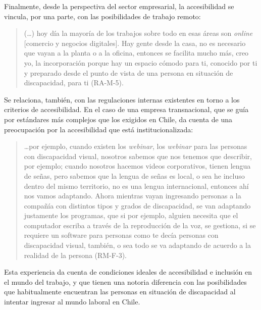 Finalmente, desde la perspectiva del sector empresarial, la
accesibilidad se vincula, por una parte, con las posibilidades de
trabajo remoto:

\begin{quote}
	(\ldots) hoy día la mayoría de los trabajos sobre todo en esas áreas son
	\emph{online} {[}comercio y negocios digitales{]}. Hay gente desde la
	casa, no es necesario que vayan a la planta o a la oficina, entonces se
	facilita mucho más, creo yo, la incorporación porque hay un espacio
	cómodo para ti, conocido por ti y preparado desde el punto de vista de
	una persona en situación de discapacidad, para ti (RA-M-5).
\end{quote}

Se relaciona, también, con las regulaciones internas existentes en torno
a los criterios de accesibilidad. En el caso de una empresa
transnacional, que se guía por estándares más complejos que los exigidos
en Chile, da cuenta de una preocupación por la accesibilidad que está
institucionalizada:

\begin{quote}
	\ldots por ejemplo, cuando existen los \emph{webinar}, los \emph{webinar}
	para las personas con discapacidad visual, nosotros sabemos que nos
	tenemos que describir, por ejemplo; cuando nosotros hacemos videos
	corporativos, tienen lengua de señas, pero sabemos que la lengua de
	señas es local, o sea he incluso dentro del mismo territorio, no es una
	lengua internacional, entonces ahí nos vamos adaptando. Ahora mientras
	vayan ingresando personas a la compañía con distintos tipos y grados de
	discapacidad, se van adaptando justamente los programas, que si por
	ejemplo, alguien necesita que el computador escriba a través de la
	reproducción de la voz, se gestiona, si se requiere un software para
	personas como te decía personas con discapacidad visual, también, o sea
	todo se va adaptando de acuerdo a la realidad de la persona (RM-F-3).
\end{quote}

Esta experiencia da cuenta de condiciones ideales de accesibilidad e
inclusión en el mundo del trabajo, y que tienen una notoria diferencia
con las posibilidades que habitualmente encuentran las personas en
situación de discapacidad al intentar ingresar al mundo laboral en
Chile.



